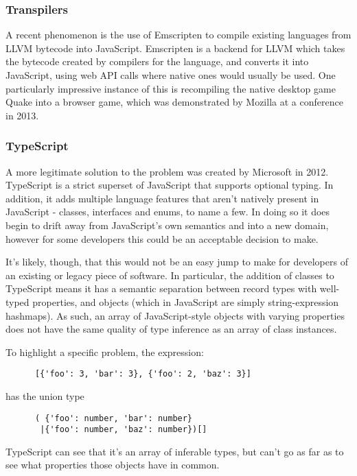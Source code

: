 \documentclass[british, twoside]{bhamthesis}
\theoremstyle{definition}
\begin{document}
  \subsubsection{Transpilers}

    A recent phenomenon is the use of Emscripten\autocite{Zakai} to compile existing languages from LLVM bytecode into JavaScript. Emscripten is a backend for LLVM which takes the bytecode created by compilers for the language, and converts it into JavaScript, using web API calls where native ones would usually be used. One particularly impressive instance of this is recompiling the native desktop game Quake into a browser game, which was demonstrated by Mozilla at a conference in 2013\autocite{unrealengine}.

  \subsubsection{TypeScript}

    A more legitimate solution to the problem was created by Microsoft in 2012. TypeScript is a strict superset of JavaScript that supports optional typing. In addition, it adds multiple language features that aren't natively present in JavaScript - classes, interfaces and enums, to name a few. In doing so it does begin to drift away from JavaScript's own semantics and into a new domain, however for some developers this could be an acceptable decision to make.

    It's likely, though, that this would not be an easy jump to make for developers of an existing or legacy piece of software. In particular, the addition of classes to TypeScript means it has a semantic separation between record types with well-typed properties, and objects (which in JavaScript are simply string-expression hashmaps). As such, an array of JavaScript-style objects with varying properties does not have the same quality of type inference as an array of class instances.

    To highlight a specific problem, the expression:
    \begin{lstlisting}
      [{'foo': 3, 'bar': 3}, {'foo': 2, 'baz': 3}]
    \end{lstlisting}
    has the union type
    \begin{lstlisting}
      ( {'foo': number, 'bar': number}
       |{'foo': number, 'baz': number})[]
    \end{lstlisting}

    TypeScript can see that it's an array of inferable types, but can't go as far as to see what properties those objects have in common.
\end{document}
